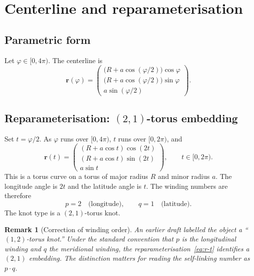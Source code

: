 \documentclass[11pt,a4paper]{article}
\newtheorem{remark}{Remark}
\begin{document}
\section{Centerline and reparameterisation}
\label{sec:centerline}

\subsection{Parametric form}

Let $\varphi\in[0,4\pi)$.  The centerline is
\begin{equation}
\label{eq:r-phi}
\mathbf{r}(\varphi)
=
\begin{pmatrix}
\bigl(R + a\cos(\varphi/2)\bigr)\cos\varphi \\[4pt]
\bigl(R + a\cos(\varphi/2)\bigr)\sin\varphi \\[4pt]
a\sin(\varphi/2)
\end{pmatrix}.
\end{equation}

\subsection{Reparameterisation: $(2,1)$-torus embedding}

Set $t=\varphi/2$.  As $\varphi$ runs over $[0,4\pi)$, $t$ runs over
$[0,2\pi)$, and
\begin{equation}
\label{eq:r-t}
\mathbf{r}(t)
=
\begin{pmatrix}
(R + a\cos t)\cos(2t) \\[4pt]
(R + a\cos t)\sin(2t) \\[4pt]
a\sin t
\end{pmatrix},
\qquad t\in[0,2\pi).
\end{equation}
This is a torus curve on a torus of major radius $R$ and minor radius $a$.
The longitude angle is $2t$ and the latitude angle is $t$.  The winding
numbers are therefore
\begin{equation}
p = 2 \quad\text{(longitude)},\qquad
q = 1 \quad\text{(latitude)}.
\end{equation}
The knot type is a $(2,1)$-torus knot.

\begin{remark}[Correction of winding order]
An earlier draft labelled the object a ``$(1,2)$-torus knot.''
Under the standard convention that $p$ is the longitudinal winding and
$q$ the meridional winding, the reparameterisation~\eqref{eq:r-t}
identifies a $(2,1)$ embedding.  The distinction matters for reading the
self-linking number as $p\cdot q$.
\end{remark}
\end{document}
